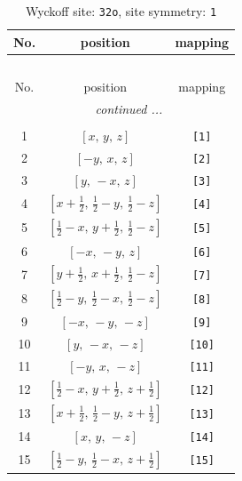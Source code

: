 \documentclass[fleqn,8pt]{jsarticle}
\begin{document}
\renewcommand{\arraystretch}{1.2}
\begin{longtable}{ccc}
\caption{Wyckoff site: {\tt 32o}, site symmetry: {\tt 1}}
 \\
 \hline \hline
No. & position & mapping \\ \hline \endfirsthead

\multicolumn{2}{l}{\tablename\ \thetable{}} \\
 \hline \hline
No. & position & mapping \\ \hline \endhead

 \hline \hline
\multicolumn{2}{r}{\footnotesize\it continued ...} \\ \endfoot

 \hline \hline
\multicolumn{2}{r}{} \\ \endlastfoot

1 & $\left[ x,\, y,\, z \right]$ & {\tt [1]} \\ \hline
2 & $\left[ - y,\, x,\, z \right]$ & {\tt [2]} \\ \hline
3 & $\left[ y,\, - x,\, z \right]$ & {\tt [3]} \\ \hline
4 & $\left[ x + \frac{1}{2},\, \frac{1}{2} - y,\, \frac{1}{2} - z \right]$ & {\tt [4]} \\ \hline
5 & $\left[ \frac{1}{2} - x,\, y + \frac{1}{2},\, \frac{1}{2} - z \right]$ & {\tt [5]} \\ \hline
6 & $\left[ - x,\, - y,\, z \right]$ & {\tt [6]} \\ \hline
7 & $\left[ y + \frac{1}{2},\, x + \frac{1}{2},\, \frac{1}{2} - z \right]$ & {\tt [7]} \\ \hline
8 & $\left[ \frac{1}{2} - y,\, \frac{1}{2} - x,\, \frac{1}{2} - z \right]$ & {\tt [8]} \\ \hline
9 & $\left[ - x,\, - y,\, - z \right]$ & {\tt [9]} \\ \hline
10 & $\left[ y,\, - x,\, - z \right]$ & {\tt [10]} \\ \hline
11 & $\left[ - y,\, x,\, - z \right]$ & {\tt [11]} \\ \hline
12 & $\left[ \frac{1}{2} - x,\, y + \frac{1}{2},\, z + \frac{1}{2} \right]$ & {\tt [12]} \\ \hline
13 & $\left[ x + \frac{1}{2},\, \frac{1}{2} - y,\, z + \frac{1}{2} \right]$ & {\tt [13]} \\ \hline
14 & $\left[ x,\, y,\, - z \right]$ & {\tt [14]} \\ \hline
15 & $\left[ \frac{1}{2} - y,\, \frac{1}{2} - x,\, z + \frac{1}{2} \right]$ & {\tt [15]} \\ \hline

\end{longtable}
\end{document}
